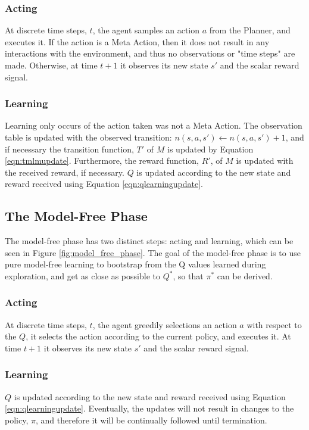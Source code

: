 \subsubsection{Acting}
At discrete time steps, $t$, the agent samples an action $a$ from the Planner, and executes it. If the action is a Meta Action, then it does not result in any interactions with the environment, and thus no observations or "time steps" are made. Otherwise, at time $t+1$ it observes its new state $s'$ and the scalar reward signal.
\subsubsection{Learning}
Learning only occurs of the action taken was not a Meta Action. The observation table is updated with the observed transition: $n(s, a, s') \leftarrow n(s, a, s')+1$, and if necessary the transition function, $T'$ of $M$ is updated by Equation \ref{eqn:tmlmupdate}. Furthermore, the reward function, $R'$, of $M$ is updated with the received reward, if necessary. $Q$ is updated according to the new state and reward received using Equation \ref{eqn:qlearningupdate}.

\subsection{The Model-Free Phase}
The model-free phase has two distinct steps: acting and learning, which can be seen in Figure \ref{fig:model_free_phase}. The goal of the model-free phase is to use pure model-free learning to bootstrap from the Q values learned during exploration, and get as close as possible to $Q^*$, so that $\pi^*$ can be derived.

\subsubsection{Acting}
At discrete time steps, $t$, the agent greedily selections an action $a$ with respect to the $Q$, it selects the action according to the current policy, and executes it. At time $t+1$ it observes its new state $s'$ and the scalar reward signal.
\subsubsection{Learning}
$Q$ is updated according to the new state and reward received using Equation \ref{eqn:qlearningupdate}. Eventually, the updates will not result in changes to the policy, $\pi$, and therefore it will be continually followed until termination.

